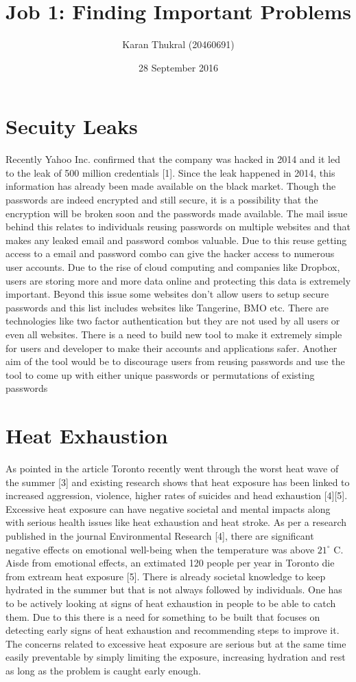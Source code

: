 \documentclass{article}
\title{Job 1: Finding Important Problems}
\author{Karan Thukral (20460691)}
\date{28 September 2016}
\begin{document}
\maketitle

\section{Secuity Leaks}
Recently Yahoo Inc. confirmed that the company was hacked in 2014 and it led to the leak of 500 million credentials [1]. Since the leak happened in 2014, this information has already been made available on the black market. Though the passwords are indeed encrypted and still secure, it is a possibility that the encryption will be broken soon and the passwords made available. The mail issue behind this relates to individuals reusing passwords on multiple websites and that makes any leaked email and password combos valuable. Due to this reuse getting access to a email and password combo can give the hacker access to numerous user accounts. Due to the rise of cloud computing and companies like Dropbox, users are storing more and more data online and protecting this data is extremely important. Beyond this issue some websites don't allow users to setup secure passwords and this list includes websites like Tangerine, BMO etc. There are technologies like two factor authentication but they are not used by all users or even all websites. There is a need to build new tool to make it extremely simple for users and developer to make their accounts and applications safer. Another aim of the tool would be to discourage users from reusing passwords and use the tool to come up with either unique passwords or permutations of existing passwords

\section{Heat Exhaustion}
As pointed in the article Toronto recently went through the worst heat wave of the summer [3] and existing research shows that heat exposure has been linked to increased aggression, violence, higher rates of suicides and head exhaustion [4][5]. Excessive heat exposure can have negative societal and mental impacts along with serious health issues like heat exhaustion and heat stroke. As per a research published in the journal Environmental Research [4], there are significant negative effects on emotional well-being when the temperature was above $21^\circ$ C. Aisde from emotional effects, an extimated 120 people per year in Toronto die from extream heat exposure [5]. There is already societal knowledge to keep hydrated in the summer but that is not always followed by individuals. One has to be actively looking at signs of heat exhaustion in people to be able to catch them. Due to this there is a need for something to be built that focuses on detecting early signs of heat exhaustion and recommending steps to improve it. The concerns related to excessive heat exposure are serious but at the same time easily preventable by simply limiting the exposure, increasing hydration and rest as long as the problem is caught early enough. 
\end{document}
